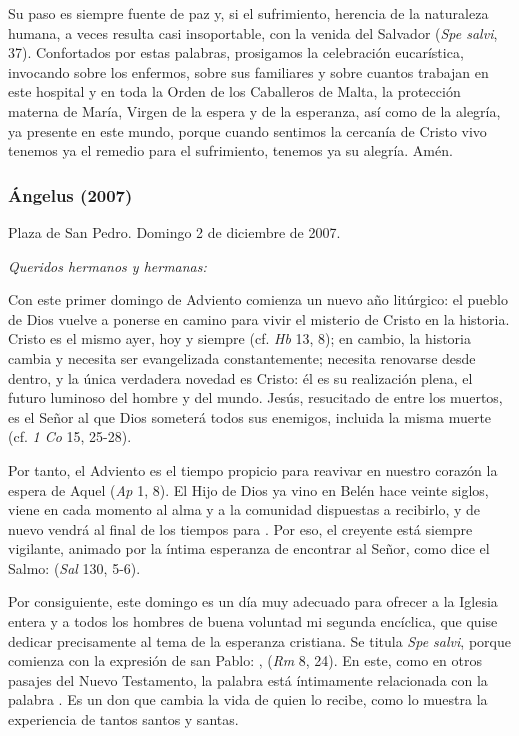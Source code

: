 \begin{body}
Su paso es siempre fuente de paz y, si el sufrimiento, herencia de la naturaleza humana, a veces resulta casi insoportable, con la venida del Salvador  (\emph{Spe salvi}, 37). Confortados por estas palabras, prosigamos la celebración eucarística, invocando sobre los enfermos, sobre sus familiares y sobre cuantos trabajan en este hospital y en toda la Orden de los Caballeros de Malta, la protección materna de María, Virgen de la espera y de la esperanza, así como de la alegría, ya presente en este mundo, porque cuando sentimos la cercanía de Cristo vivo tenemos ya el remedio para el sufrimiento, tenemos ya su alegría. Amén.


\subsubsection{Ángelus (2007)}

Plaza de San Pedro. Domingo 2 de diciembre de 2007.

\emph{Queridos hermanos y hermanas:}

Con este primer domingo de Adviento comienza un nuevo año litúrgico: el pueblo de Dios vuelve a ponerse en camino para vivir el misterio de Cristo en la historia. Cristo es el mismo ayer, hoy y siempre (cf. \emph{Hb} 13, 8); en cambio, la historia cambia y necesita ser evangelizada constantemente; necesita renovarse desde dentro, y la única verdadera novedad es Cristo: él es su realización plena, el futuro luminoso del hombre y del mundo. Jesús, resucitado de entre los muertos, es el Señor al que Dios someterá todos sus enemigos, incluida la misma muerte (cf. \emph{1 Co} 15, 25-28).

Por tanto, el Adviento es el tiempo propicio para reavivar en nuestro corazón la espera de Aquel  (\emph{Ap} 1, 8). El Hijo de Dios ya vino en Belén hace veinte siglos, viene en cada momento al alma y a la comunidad dispuestas a recibirlo, y de nuevo vendrá al final de los tiempos para . Por eso, el creyente está siempre vigilante, animado por la íntima esperanza de encontrar al Señor, como dice el Salmo:  (\emph{Sal} 130, 5-6).

Por consiguiente, este domingo es un día muy adecuado para ofrecer a la Iglesia entera y a todos los hombres de buena voluntad mi segunda encíclica, que quise dedicar precisamente al tema de la esperanza cristiana. Se titula \emph{Spe salvi}, porque comienza con la expresión de san Pablo: \emph{},  (\emph{Rm} 8, 24). En este, como en otros pasajes del Nuevo Testamento, la palabra  está íntimamente relacionada con la palabra . Es un don que cambia la vida de quien lo recibe, como lo muestra la experiencia de tantos santos y santas.


\end{body}
